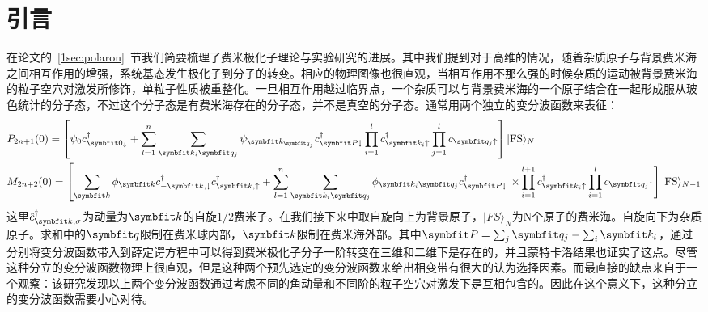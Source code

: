 \section{引言}\label{3sec:intro}
在论文的~\ref{1sec:polaron}~节我们简要梳理了费米极化子理论与实验研究的进展。其中我们提到对于高维的情况，随着杂质原子与背景费米海之间相互作用的增强，系统基态发生极化子到分子的转变\cite{Prokoffermi,combescot2010analytical,Punk_pm,Zollner2011Polarons,Schmidt2012fermi,Trefzger2012Impurity,Parish2011pm,Parish2013highly,Vlietinck2014diag,Kriss2014diag}。相应的物理图像也很直观，当相互作用不那么强的时候杂质的运动被背景费米海的粒子空穴对激发所修饰，单粒子性质被重整化。一旦相互作用越过临界点，一个杂质可以与背景费米海的一个原子结合在一起形成服从玻色统计的分子态，不过这个分子态是有费米海存在的分子态，并不是真空的分子态。通常用两个独立的变分波函数来表征\cite{chevy2006,Combescot20071ph,Combescot20071ph008full,combescot2010analytical,Punk_pm,Zollner2011Polarons,Schmidt2012fermi,Trefzger2012Impurity,Mathy2011trimers,Zollner2011Polarons,Parish2011pm,Parish2013highly,Cui2010Stability,Ngampruetikorn_2012}：
\begin{equation}
\begin{aligned}
&P_{2 n+1}(0) =\left[\psi_{0} c_{\Vector{0}_{\downarrow}}^{\dagger}+\sum_{l=1}^{n} \sum_{\Vector{k}_{i} \Vector{q}_{j}} \psi_{\Vector{k}_{\Vector{q}_{j}}} c_{\Vector{P} \downarrow}^{\dagger} \prod_{i=1}^{l} c_{\Vector{k}_{i} \uparrow}^{\dagger} \prod_{j=1}^{l} c_{\Vector{q}_{j} \uparrow}\right]|\mathrm{FS}\rangle_{N}\\
&M_{2 n+2}(0)= {\left[\sum_{\Vector{k}} \phi_{\Vector{k}} c_{-\Vector{k}, \downarrow}^{\dagger} c_{\Vector{k}, \uparrow}^{\dagger}+\sum_{l=1}^{n} \sum_{\Vector{k}_{i} \Vector{q}_{j}} \phi_{\Vector{k}_{i} \Vector{q}_{j}} c_{\Vector{P} \downarrow}^{\dagger}\right.} \left.\times \prod_{i=1}^{l+1} c_{\Vector{k}_{i} \uparrow}^{\dagger} \prod_{i=1}^{l} c_{\Vector{q}_{j} \uparrow}\right]|\mathrm{FS}\rangle_{N-1}
\end{aligned}
\end{equation}
这里$\hat{c}^\dagger_{\Vector{k},\sigma}$为动量为$\Vector{k}$的自旋$1/2$费米子。在我们接下来中取自旋向上为背景原子，$|FS\rangle_N$为N个原子的费米海。自旋向下为杂质原子。求和中的$\Vector{q}$限制在费米球内部，$\Vector{k}$限制在费米海外部。其中$\Vector{P}=\sum_{j} \Vector{q}_{j}-\sum_{i} \Vector{k}_{i}$，通过分别将变分波函数带入到薛定谔方程中可以得到费米极化子分子一阶转变在三维\cite{combescot2010analytical,Punk_pm,Zollner2011Polarons,Schmidt2012fermi,Trefzger2012Impurity}和二维\cite{Parish2011pm,Parish2013highly}下是存在的，并且蒙特卡洛结果也证实了这点\cite{Prokoffermi,Vlietinck2014diag,Kriss2014diag}。尽管这种分立的变分波函数物理上很直观，但是这种两个预先选定的变分波函数来给出相变带有很大的认为选择因素。而最直接的缺点来自于一个观察\cite{edwards2013smooth}：该研究发现以上两个变分波函数通过考虑不同的角动量和不同阶的粒子空穴对激发下是互相包含的。因此在这个意义下，这种分立的变分波函数需要小心对待。


